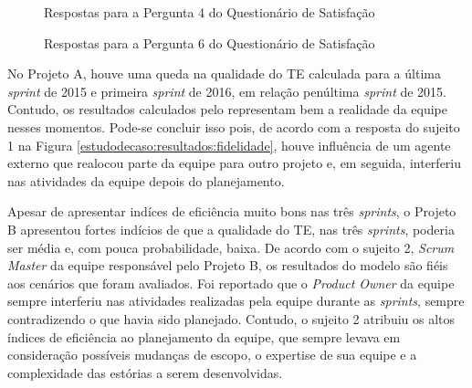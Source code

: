 \begin{figure}[ht!]
\begin{center}
	\end{center}
	\caption{Respostas para a Pergunta 4 do Questionário de Satisfação}
	\label{estudodecaso:resultados:respostasAuxilio}
\end{figure}

\begin{figure}[ht!]
\begin{center}
	\end{center}
	\caption{Respostas para a Pergunta 6 do Questionário de Satisfação}
	\label{estudodecaso:resultados:respostasUtilizacao}
\end{figure}

No Projeto A, houve uma queda na qualidade do TE calculada para a última \textit{sprint} de 2015 e primeira \textit{sprint} de 2016, em relação penúltima \textit{sprint} de 2015. Contudo, os resultados calculados pelo representam bem a realidade da equipe nesses momentos. Pode-se concluir isso pois, de acordo com a resposta do sujeito 1 na Figura \ref{estudodecaso:resultados:fidelidade}, houve influência de um agente externo que realocou parte da equipe para outro projeto e, em seguida, interferiu nas atividades da equipe depois do planejamento.

Apesar de apresentar indíces de eficiência muito bons nas três \textit{sprints}, o Projeto B apresentou fortes indícios de que a qualidade do TE, nas três \textit{sprints}, poderia ser média e, com pouca probabilidade, baixa. De acordo com o sujeito 2, \textit{Scrum Master} da equipe responsável pelo Projeto B, os resultados do modelo são fiéis aos cenários que foram avaliados. Foi reportado que o \textit{Product Owner} da equipe sempre interferiu nas atividades realizadas pela equipe durante as \textit{sprints}, sempre contradizendo o que havia sido planejado. Contudo, o sujeito 2 atribuiu os altos índices de eficiência ao planejamento da equipe, que sempre levava em consideração possíveis mudanças de escopo, o expertise de sua equipe e a complexidade das estórias a serem desenvolvidas.

